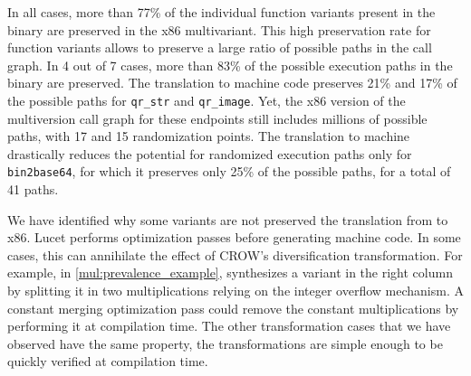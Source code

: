  
In all cases, more than 77\% of the individual function variants present in the binary are preserved in the x86 multivariant. This high preservation rate for function variants allows to preserve a large ratio of possible paths in the call graph.
In 4 out of 7 cases, more than 83\% of the possible execution paths in the  binary are preserved.
The translation to machine code preserves 21\% and 17\% of the possible paths for \texttt{qr\_str} and \texttt{qr\_image}. Yet, the x86 version of the multiversion call graph for these endpoints still includes millions of possible paths, with 17 and 15 randomization points. The translation to machine drastically reduces the potential for randomized execution paths only for \texttt{bin2base64}, for which it preserves only 25\% of the possible paths, for a total of 41 paths.

We have identified why some variants are not preserved the translation from to x86. Lucet performs optimization passes before generating machine code. 
In some cases, this can annihilate the effect of CROW's diversification transformation. 
For example, in \autoref{mul:prevalence_example}, synthesizes a variant in the right column by splitting it in two  multiplications relying on the integer overflow mechanism. 
A  constant merging optimization pass could remove the constant multiplications by performing it at compilation time. 
The other transformation cases that we have observed have the same property, the transformations are simple enough to be quickly verified at compilation time.

